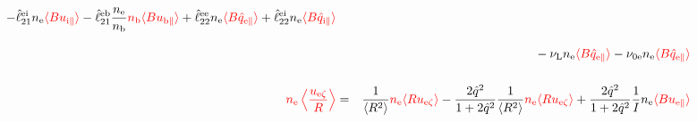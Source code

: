 \documentclass[11pt]{article}
\def\r#1{{\rm#1}}
\def\ave#1{\left\langle#1\right\rangle}
\def\aves#1{\langle#1\rangle}
\def\para{\parallel}
\def\nee{n_\r{e}}
\def\nb{n_\r{b}}
\def\uezt{u_{\r{e}\zeta}}
\def\uepara{u_{\r{e}\para}}
\def\uipara{u_{\r{i}\para}}
\def\ubpara{u_{\r{b}\para}}
\def\qhatepara{\hat{q}_{\r{e}\para}}
\def\qhatipara{\hat{q}_{\r{i}\para}}
\def\nune{\nu_\r{0e}}
\def\nuL{\nu_\r{L}}
\def\red#1{\textcolor{red}{#1}}
\begin{document}
\begin{eqnarray}
  - \hat{\ell}_{21}^{\r{ei}} \nee \red{\aves{B \uipara}}
  - \hat{\ell}_{21}^{\r{eb}} \frac{\nee}{\nb} \red{\nb \aves{B \ubpara}}
%
  + \hat{\ell}_{22}^{\r{ee}} \nee \red{\aves{B \qhatepara}}
  + \hat{\ell}_{22}^{\r{ei}} \nee \red{\aves{B \qhatipara}}
\nonumber\\[3mm]&&{}
%
  - \nuL \nee \red{\aves{B \qhatepara}}
%
  - \nune \nee \red{\aves{B \qhatepara}}
\\[5mm]
    \red{\nee \ave{\frac{\uezt}{R}}} &=&
%
    \frac{1}{\aves{R^2}} \red{\nee \aves{R\uezt}}
%
  - \frac{2\hat{q}^2}{1+2\hat{q}^2} \frac{1}{\aves{R^2}}\red{\nee\aves{R\uezt}}
%
  + \frac{2\hat{q}^2}{1+2\hat{q}^2} \frac{1}{I}\nee \red{\aves{B\uepara}}
\end{eqnarray}
%

\clearpage
\end{document}
